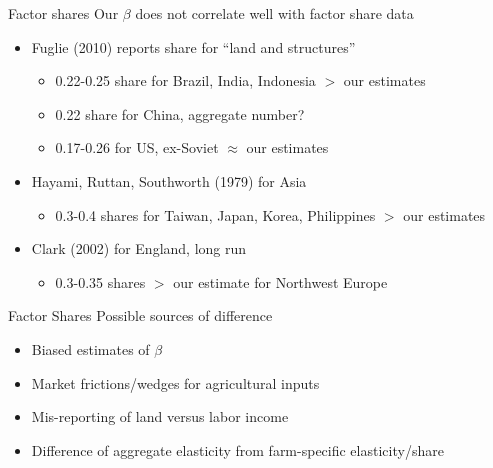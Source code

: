 \documentclass[10pt, xcolor=dvipsnames]{beamer}
\begin{document}
\begin{frame}{Factor shares}\label{shares}
Our $\beta$ does not correlate well with factor share data
\begin{itemize}
  \item Fuglie (2010) reports share for ``land and structures''
  \begin{itemize}
    \item 0.22-0.25 share for Brazil, India, Indonesia $>$ our estimates
    \item 0.22 share for China, aggregate number?
    \item 0.17-0.26 for US, ex-Soviet $\approx$ our estimates
  \end{itemize}
  \item Hayami, Ruttan, Southworth (1979) for Asia
    \begin{itemize}
      \item 0.3-0.4 shares for Taiwan, Japan, Korea, Philippines $>$ our estimates
    \end{itemize}
  \item Clark (2002) for England, long run
    \begin{itemize}
      \item 0.3-0.35 shares $>$ our estimate for Northwest Europe
    \end{itemize}
\end{itemize}
\end{frame}

\begin{frame}{Factor Shares}
Possible sources of difference
\begin{itemize}
  \item Biased estimates of $\beta$
  \item Market frictions/wedges for agricultural inputs
  \item Mis-reporting of land versus labor income
  \item Difference of aggregate elasticity from farm-specific elasticity/share
\end{itemize}

\hfill \hyperlink{robustness}{}
\end{frame}
\end{document}
